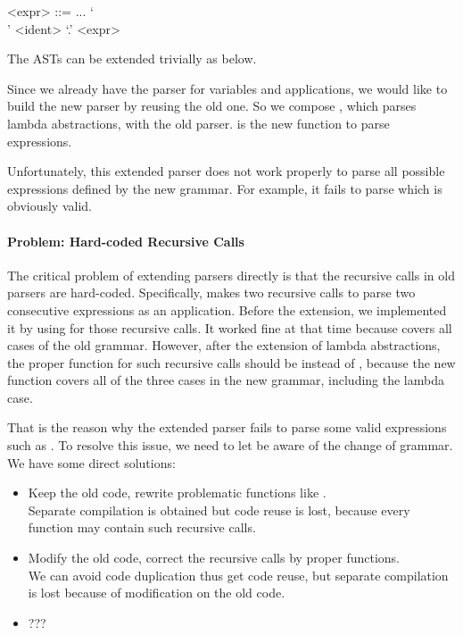 \setlength{\grammarindent}{5em}
\begin{grammar}
<expr> ::= ...
    \alt `\\' <ident> `.' <expr>
\end{grammar}

The ASTs can be extended trivially as below.


Since we already have the parser for variables and applications, we would like to build the new parser by reusing the old one. So we compose , which parses lambda abstractions, with the old parser.  is the new function to parse expressions.


Unfortunately, this extended parser does not work properly to parse all possible expressions defined by the new grammar. For example, it fails to parse   which is obviously valid.

\paragraph{Problem: Hard-coded Recursive Calls} The critical problem of extending parsers directly is that the recursive calls in old parsers are hard-coded. Specifically,  makes two recursive calls to parse two consecutive expressions as an application. Before the extension, we implemented it by using  for those recursive calls. It worked fine at that time because  covers all cases of the old grammar. However, after the extension of lambda abstractions, the proper function for such recursive calls should be  instead of , because the new function  covers all of the three cases in the new grammar, including the lambda case.

That is the reason why the extended parser fails to parse some valid expressions such as  . To resolve this issue, we need to let  be aware of the change of grammar. We have some direct solutions:

\begin{itemize}
    \item Keep the old code, rewrite problematic functions like . \\Separate compilation is obtained but code reuse is lost, because every function may contain such recursive calls.
    \item Modify the old code, correct the recursive calls by proper functions. \\We can avoid code duplication thus get code reuse, but separate compilation is lost because of modification on the old code.
    \item ??? 
\end{itemize}

